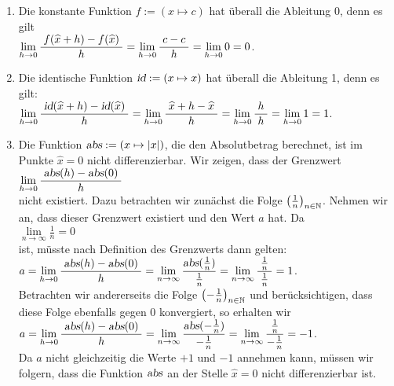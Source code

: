 \examples
\begin{enumerate}
\item Die konstante Funktion $f := (x \mapsto c)$ hat \"uberall die Ableitung
      $0$, denn es gilt \\[0.3cm]
      \hspace*{1.3cm}$\lim\limits_{h \rightarrow 0} \displaystyle\frac{\;\displaystyle f(\widehat{x} + h) - f(\widehat{x})\;}{\;\displaystyle h\;} =
\lim\limits_{h \rightarrow 0} \displaystyle\frac{\;\displaystyle c - c\;}{\;\displaystyle h\;} = \lim\limits_{h \rightarrow 0} 0 = 0$.
\item Die identische Funktion $\textsl{id} := (x \mapsto x)$ hat \"uberall die Ableitung 1,
      denn es gilt: 
      \\[0.3cm]
      \hspace*{1.3cm}
      $\lim\limits_{h \rightarrow 0} \displaystyle\frac{\;\displaystyle\textsl{id}(\widehat{x} + h) - \textsl{id}(\widehat{x})\;}{\;\displaystyle h\;} =
       \lim\limits_{h \rightarrow 0} \displaystyle\frac{\;\displaystyle\widehat{x} + h - \widehat{x}\;}{\;\displaystyle h\;} =
       \lim\limits_{h \rightarrow 0} \displaystyle\frac{\;\displaystyle h\;}{\;\displaystyle h\;} = \lim\limits_{h \rightarrow 0} 1 = 1$.
\item Die Funktion $\textsl{abs} := ( x \mapsto |x|)$, die den Absolutbetrag berechnet, ist im
      Punkte $\widehat{x} = 0$ nicht differenzierbar.  Wir zeigen, dass der Grenzwert
      \\[0.3cm]
      \hspace*{1.3cm}
            $\lim\limits_{h \rightarrow 0} \displaystyle\frac{\;\displaystyle\textsl{abs}(h) - \textsl{abs}(0)\;}{\;\displaystyle h\;}$
      \\[0.3cm]
      nicht existiert.  Dazu betrachten wir zun\"achst die Folge $\bigl(\frac{1}{n}\bigr)_{n\in\mathbb{N}}$.
      Nehmen wir an, dass dieser Grenzwert existiert und den Wert $a$ hat.  
      Da \\[0.3cm]
      \hspace*{1.3cm}
      $\lim\limits_{n\rightarrow\infty} \frac{1}{n} = 0$ 
      \\[0.3cm]
      ist, m\"usste nach Definition des Grenzwerts dann gelten: \\[0.3cm]
      \hspace*{1.3cm}
      $a = \displaystyle \lim\limits_{h \rightarrow 0} \displaystyle\frac{\;\displaystyle\textsl{abs}(h) - \textsl{abs}(0)\;}{\;\displaystyle h\;} = 
       \lim\limits_{n\rightarrow\infty} \frac{\textsl{abs}(\frac{1}{n})}{\frac{1}{n}} = 
       \lim\limits_{n\rightarrow\infty} \frac{\;\frac{1}{n}\;}{\frac{1}{n}} = 1 $.
      \\[0.3cm]
      Betrachten wir andererseits die Folge $\bigl(-\frac{1}{n}\bigr)_{n\in\mathbb{N}}$ und ber\"ucksichtigen,
      dass diese Folge ebenfalls gegen 0 konvergiert, so erhalten wir
      \\[0.3cm]
      \hspace*{1.3cm}
      $a = \displaystyle \lim\limits_{h \rightarrow 0} \displaystyle\frac{\;\displaystyle\textsl{abs}(h) - \textsl{abs}(0)\;}{\;\displaystyle h\;} = 
       \lim\limits_{n\rightarrow\infty} \frac{\textsl{abs}(-\frac{1}{n})}{-\frac{1}{n}} = 
       \lim\limits_{n\rightarrow\infty} \frac{\;\frac{1}{n}\;}{-\frac{1}{n}} = -1$.
      \\[0.3cm]
      Da $a$ nicht gleichzeitig die Werte $+1$ und $-1$ annehmen kann, m\"ussen wir folgern,
      dass die Funktion $\textsl{abs}$ an der Stelle $\widehat{x} = 0$ nicht
      differenzierbar ist.  \eox
\end{enumerate}


